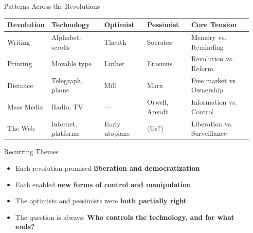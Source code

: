 \documentclass[aspectratio=169]{beamer}
\begin{document}
\begin{frame}{Patterns Across the Revolutions}
\begin{table}
\centering
\scriptsize
\begin{tabular}{@{}llllp{2.8cm}@{}}
\toprule
\textbf{Revolution} & \textbf{Technology} & \textbf{Optimist} & \textbf{Pessimist} & \textbf{Core Tension} \\
\midrule
Writing & Alphabet, scrolls & Theuth & Socrates & Memory vs. Reminding \\
Printing & Movable type & Luther & Erasmus & Revolution vs. Reform \\
Distance & Telegraph, phone & Mill & Marx & Free market vs. Ownership \\
Mass Media & Radio, TV & --- & Orwell, Arendt & Information vs. Control \\
The Web & Internet, platforms & Early utopians & (Us?) & Liberation vs. Surveillance \\
\bottomrule
\end{tabular}
\end{table}

\vspace{0.3em}
\begin{block}{Recurring Themes}
\begin{itemize}
  \item Each revolution promised \textbf{liberation and democratization}
  \item Each enabled \textbf{new forms of control and manipulation}
  \item The optimists and pessimists were \textbf{both partially right}
  \item The question is always: \textbf{Who controls the technology, and for what ends?}
\end{itemize}
\end{block}
\end{frame}
\end{document}
